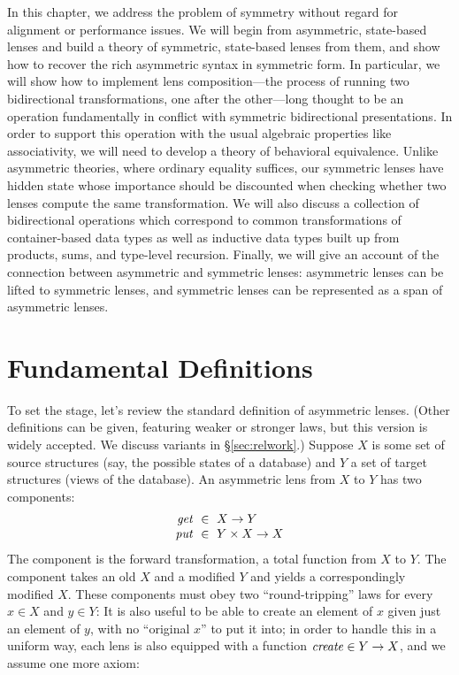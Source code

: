 \ifdissertation
In this chapter, we address the problem of symmetry without regard for
alignment or performance issues. We will begin from asymmetric, state-based
lenses and build a theory of symmetric, state-based lenses from them, and
show how to recover the rich asymmetric syntax in symmetric form. In
particular, we will show how to implement lens composition---the process of
running two bidirectional transformations, one after the other---long
thought to be an operation fundamentally in conflict with symmetric
bidirectional presentations. In order to support this operation with the
usual algebraic properties like associativity, we will need to develop a
theory of behavioral equivalence. Unlike asymmetric theories, where ordinary
equality suffices, our symmetric lenses have hidden state whose importance
should be discounted when checking whether two lenses compute the same
transformation. We will also discuss a collection of bidirectional
operations which correspond to common transformations of container-based
data types as well as inductive data types built up from products, sums, and
type-level recursion. Finally, we will give an account of the connection
between asymmetric and symmetric lenses: asymmetric lenses can be lifted to
symmetric lenses, and symmetric lenses can be represented as a span of
asymmetric lenses.
\fi%

\section{Fundamental Definitions} \label{symm}

\ifcomplement
{}
%
To set the stage, let's review the standard definition of
asymmetric lenses.  
%
(Other definitions can be given, featuring weaker or stronger laws, but this
version is widely accepted.  We discuss variants in
\S\ref{sec:relwork}.)
%
Suppose $X$ is some set of source structures (say, the possible states of a
database) and $Y$ a set of target structures (views of the database).
%
An asymmetric lens from $X$ to $Y$ has two components:
\[ 
\begin{array}{r@{\ \;}c@{\ \;}l}
\GET &\in& X \arrow Y\\
\PUT &\in& Y \times X \arrow X
\end{array}
\]
The \GET{} component is the forward transformation, a total function from
$X$ to $Y$.  The \PUT{} component takes an old $X$ and a modified $Y$ and
yields a correspondingly modified $X$.  These components
must obey two ``round-tripping'' laws for every $x \in X$ and $y
\in Y$:
%
%
It is also useful to be able to create an element of $x$ given just an
element of $y$, with no ``original $x$'' to put it into; in order to handle
this in a 
uniform way, each lens is also equipped with a
function $\mathit{create}\in Y\rightarrow X$, and we assume one more axiom:
\fi%

